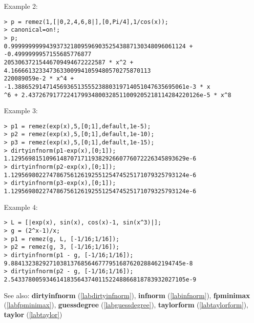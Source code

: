\noindent Example 2: 
\begin{center}\begin{minipage}{15cm}\begin{Verbatim}[frame=single]
> p = remez(1,[|0,2,4,6,8|],[0,Pi/4],1/cos(x));
> canonical=on!;
> p;
0.99999999994393732180959690352543887130348096061124 + -0.4999999957155685776877
20530637215446709494672222587 * x^2 + 4.1666613233473633009941059480570275870113
220089059e-2 * x^4 + -1.3886529147145693651355523880319714051047635695061e-3 * x
^6 + 2.4372679177224179934800328511009205218114284220126e-5 * x^8
\end{Verbatim}
\end{minipage}\end{center}
\noindent Example 3: 
\begin{center}\begin{minipage}{15cm}\begin{Verbatim}[frame=single]
> p1 = remez(exp(x),5,[0;1],default,1e-5);
> p2 = remez(exp(x),5,[0;1],default,1e-10);
> p3 = remez(exp(x),5,[0;1],default,1e-15);
> dirtyinfnorm(p1-exp(x),[0;1]);
1.12956981510961487071711938292660776072226345893629e-6
> dirtyinfnorm(p2-exp(x),[0;1]);
1.12956980227478675612619255125474525171079325793124e-6
> dirtyinfnorm(p3-exp(x),[0;1]);
1.12956980227478675612619255125474525171079325793124e-6
\end{Verbatim}
\end{minipage}\end{center}
\noindent Example 4: 
\begin{center}\begin{minipage}{15cm}\begin{Verbatim}[frame=single]
> L = [|exp(x), sin(x), cos(x)-1, sin(x^3)|];
> g = (2^x-1)/x;
> p1 = remez(g, L, [-1/16;1/16]);
> p2 = remez(g, 3, [-1/16;1/16]);
> dirtyinfnorm(p1 - g, [-1/16;1/16]);
9.8841323829271038137685646777951687620288462194745e-8
> dirtyinfnorm(p2 - g, [-1/16;1/16]);
2.54337800593461418356437401152248866818783932027105e-9
\end{Verbatim}
\end{minipage}\end{center}
See also: \textbf{dirtyinfnorm} (\ref{labdirtyinfnorm}), \textbf{infnorm} (\ref{labinfnorm}), \textbf{fpminimax} (\ref{labfpminimax}), \textbf{guessdegree} (\ref{labguessdegree}), \textbf{taylorform} (\ref{labtaylorform}), \textbf{taylor} (\ref{labtaylor})
